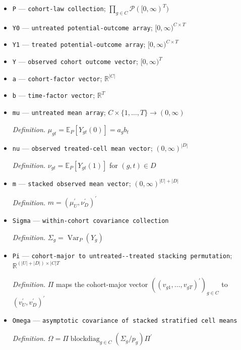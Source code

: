 \documentclass{article}
\begin{document}
\begin{itemize}
  \par\smallskip\noindent\emph{Definition.} \(\mathcal T_0=\{(g,1):g\in C\}\cup\{(\infty,t):2\le t\le T\}\)
  \item \texttt{P} --- \texttt{cohort-\allowbreak{}law collection}; \(\prod_{g\in C}\mathcal P([0,\infty)^T)\)
  \item \texttt{Y0} --- \texttt{untreated potential-\allowbreak{}outcome array}; \([0,\infty)^{C\times T}\)
  \item \texttt{Y1} --- \texttt{treated potential-\allowbreak{}outcome array}; \([0,\infty)^{C\times T}\)
  \item \texttt{Y} --- \texttt{observed cohort outcome vector}; \([0,\infty)^T\)
  \item \texttt{a} --- \texttt{cohort-\allowbreak{}factor vector}; \(\mathbb R^{|C|}\)
  \item \texttt{b} --- \texttt{time-\allowbreak{}factor vector}; \(\mathbb R^T\)
  \item \texttt{mu} --- \texttt{untreated mean array}; \(C\times\{1,\ldots,T\}\to(0,\infty)\)
  \par\smallskip\noindent\emph{Definition.} \(\mu_{gt}=\mathbb E_P[Y_{gt}(0)]=a_gb_t\)
  \item \texttt{nu} --- \texttt{observed treated-\allowbreak{}cell mean vector}; \((0,\infty)^{|D|}\)
  \par\smallskip\noindent\emph{Definition.} \(\nu_{gt}=\mathbb E_P[Y_{gt}(1)]\) for \((g,t)\in D\)
  \item \texttt{m} --- \texttt{stacked observed mean vector}; \((0,\infty)^{|U|+|D|}\)
  \par\smallskip\noindent\emph{Definition.} \(m=(\mu_U^{\prime},\nu_D^{\prime})^{\prime}\)
  \item \texttt{Sigma} --- \texttt{within-\allowbreak{}cohort covariance collection}
  \par\smallskip\noindent\emph{Definition.} \(\Sigma_g=\operatorname{Var}_P(Y_g)\)
  \item \texttt{Pi} --- \texttt{cohort-\allowbreak{}major to untreated-\allowbreak{}-\allowbreak{}treated stacking permutation}; \(\mathbb R^{(|U|+|D|)\times |C|T}\)
  \par\smallskip\noindent\emph{Definition.} \(\Pi\) maps the cohort-major vector \(((v_{g1},\ldots,v_{gT})^{\prime})_{g\in C}\) to \((v_U^{\prime},v_D^{\prime})^{\prime}\)
  \item \texttt{Omega} --- \texttt{asymptotic covariance of stacked stratified cell means}
  \par\smallskip\noindent\emph{Definition.} \(\Omega=\Pi\operatorname{blockdiag}_{g\in C}(\Sigma_g/p_g)\Pi^{\prime}\)

\end{itemize}
\end{document}
